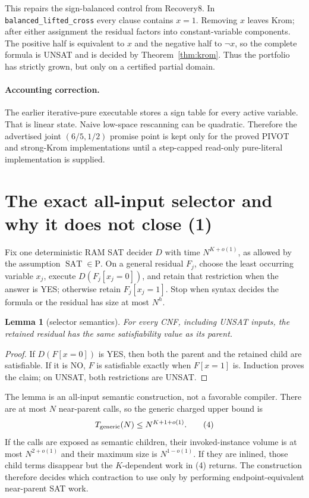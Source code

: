 \documentclass[11pt]{article}
\newtheorem{lemma}[theorem]{Lemma}
\newcommand{\SAT}{\operatorname{SAT}}
\begin{document}
This repairs the sign-balanced control from Recovery8.  In
\texttt{balanced\_lifted\_cross} every clause contains $x=1$.  Removing $x$
leaves Krom; after either assignment the residual factors into
constant-variable components.  The positive half is equivalent to $x$ and
the negative half to $\neg x$, so the complete formula is UNSAT and is
decided by Theorem~\ref{thm:krom}.  Thus the portfolio has strictly grown,
but only on a certified partial domain.

\paragraph{Accounting correction.}
The earlier iterative-pure executable stores a sign table for every active
variable.  That is linear state.  Naive low-space rescanning can be
quadratic.  Therefore the advertised joint $(6/5,1/2)$ promise point is kept
only for the proved PIVOT and strong-Krom implementations until a
step-capped read-only pure-literal implementation is supplied.

\section{The exact all-input selector and why it does not close (1)}
Fix one deterministic RAM SAT decider $D$ with time $N^{K+o(1)}$, as allowed
by the assumption $\SAT\in\mathrm P$.  On a general residual $F_j$, choose
the least occurring variable $x_j$, execute $D(F_j[x_j=0])$, and retain that
restriction when the answer is YES; otherwise retain $F_j[x_j=1]$.  Stop
when syntax decides the formula or the residual has size at most $N^h$.

\begin{lemma}[selector semantics]
For every CNF, including UNSAT inputs, the retained residual has the same
satisfiability value as its parent.
\end{lemma}
\begin{proof}
If $D(F[x=0])$ is YES, then both the parent and the retained child are
satisfiable.  If it is NO, $F$ is satisfiable exactly when $F[x=1]$ is.
Induction proves the claim; on UNSAT, both restrictions are UNSAT.
\end{proof}

The lemma is an all-input semantic construction, not a favorable compiler.
There are at most $N$ near-parent calls, so the generic charged upper bound is
\begin{equation}
 T_{\rm generic}(N)\le N^{K+1+o(1)}.                    \tag{4}
\end{equation}
If the calls are exposed as semantic children, their invoked-instance
volume is at most $N^{2+o(1)}$ and their maximum size is $N^{1-o(1)}$.
If they are inlined, those child terms disappear but the $K$-dependent work
in (4) returns.  The construction therefore decides which contraction to
use only by performing endpoint-equivalent near-parent SAT work.
\end{document}
